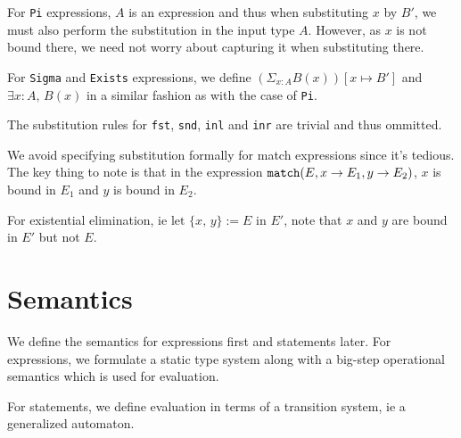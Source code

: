 \documentclass{article}
\begin{document}
For \verb|Pi| expressions, $A$ is an expression and thus when substituting $x$ by
$B'$, we must also perform the substitution in the input type $A$. However, as
$x$ is not bound there, we need not worry about capturing it when substituting there. 

For \verb|Sigma| and \verb|Exists| expressions, we define 
$(\Sigma_{x : A} B(x)) [x \mapsto B']$ and $\exists x : A, \, B(x)$ in a 
similar fashion as with the case of \verb|Pi|.

The substitution rules for \texttt{fst}, \texttt{snd}, \texttt{inl} and
\texttt{inr} are trivial and thus ommitted.

We avoid specifying substitution formally for match expressions since it's
tedious. The key thing to note is that in the expression
$\texttt{match}(E, x \rightarrow E_1, y \rightarrow E_2)$, $x$ is bound in $E_1$ and $y$
is bound in $E_2$.

For existential elimination, ie $\text{let } \{x, \, y\} := E \text{ in } E'$,
note that $x$ and $y$ are bound in $E'$ but not $E$.

\section{Semantics}
We define the semantics for expressions first and statements later.
For expressions, we formulate a static type system along with a big-step
operational semantics which is used for evaluation.

For statements, we define evaluation in terms of a transition system, ie a
generalized automaton.


\begin{comment}
  https://www.andres-loeh.de/LambdaPi/LambdaPi.pdf
  http://math.andrej.com/2012/11/08/how-to-implement-dependent-type-theory-i/
  
  http://fsl.cs.illinois.edu/images/archive/b/b3/20110221180817!CS522-Spring-2011-PL-book-bigstep.pdf
  https://www.cs.cornell.edu/courses/cs4110/2010fa/lectures/lecture03.pdf
\end{comment}
\end{document}
